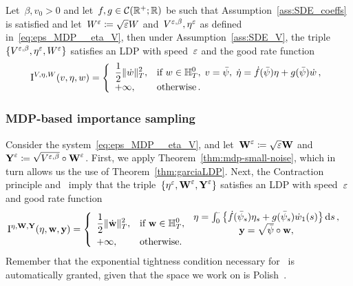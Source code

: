 \begin{theorem}\label{thm:mdp-small-noise}
Let~$\beta, v_0>0$ and let~$f, g \in \mathcal{C}(\mathbb{R}^+;  \mathbb{R})$ be such that Assumption~\ref{ass:SDE_coeffs} is satisfied and let~$W^{\varepsilon} \coloneqq \sqrt{\varepsilon}W$ and~$V^{\varepsilon,\beta}, \eta^{\varepsilon}$ as defined in~\eqref{eq:eps_MDP__eta_V}, then under Assumption~\ref{ass:SDE_V}, the triple
$\{V^{\varepsilon,\beta}, \eta^\varepsilon,W^\varepsilon\}$ satisfies an LDP with speed~$\varepsilon$ and the good rate function
\begin{equation*}
\mathrm{I}^{V,\eta,W}(v,\eta,w) = 
\left\{
\begin{array}{ll}
\displaystyle \frac{1}{2}\|\dot{w}\|_{T}^2, & \text{if }
\displaystyle 
w \in \mathbb{H}_T^0,\;
v = \bar\psi,\;
\dot{\eta} = \dot{f}(\bar\psi)\eta + g(\bar\psi)\dot{w}\,,\\
+\infty, & \text{otherwise}\,.
\end{array}
\right.
\end{equation*}
\end{theorem}


\subsubsection{MDP-based importance sampling}
Consider the system~\eqref{eq:eps_MDP__eta_V}, 
and let~$\boldsymbol{\mathrm{W}}^\varepsilon \coloneqq \sqrt{\varepsilon}\boldsymbol{\mathrm{W}}$ and~$\boldsymbol{\mathrm{Y}}^\varepsilon \coloneqq \sqrt{V^{\varepsilon,\beta}}\circ \boldsymbol{\mathrm{W}}^\varepsilon$. 
First, we apply Theorem~\ref{thm:mdp-small-noise}, which in turn allows us the use of Theorem~\ref{thm:garciaLDP}. Next, the Contraction principle and~\cite[Exercise 4.2.7]{Dembo2010LargeApplications} imply that the triple~$\{\eta^\varepsilon,\boldsymbol{\mathrm{W}}^\varepsilon, \boldsymbol{\mathrm{Y}}^\varepsilon\}$ satisfies an LDP with speed~$\varepsilon$ and good rate function
\begin{equation*}
\mathrm{I}^{\eta,\boldsymbol{\mathrm{W}},\boldsymbol{\mathrm{Y}}}(\eta,\boldsymbol{\mathrm{w}}, \boldsymbol{\mathrm{y}}) =
\left\{
\begin{array}{ll}
\displaystyle 
\frac{1}{2}\|\dot{\boldsymbol{\mathrm{w}}}\|_{T}^2, & \text{if }
\displaystyle 
\boldsymbol{\mathrm{w}} \in \mathbb{H}_T^0,\; \begin{array}{cc}
    \eta = \int_0^\cdot\left\{\dot{f}(\bar\psi_s)\eta_s + g(\bar\psi_s)\dot{w}_1(s)\right\}\mathrm{d} s\,, \\
     \boldsymbol{\mathrm{y}} = \sqrt{\bar\psi}\circ \boldsymbol{\mathrm{w}},
\end{array}
\\
+\infty, & \text{otherwise}.
\end{array}
\right.
\end{equation*}
Remember that the exponential tightness condition necessary for~\cite[Exercise 4.2.7]{Dembo2010LargeApplications} is automatically granted, given that the space we work on is Polish~\cite[Lemma~2.6]{Lynch1987LargeIncrements}.


